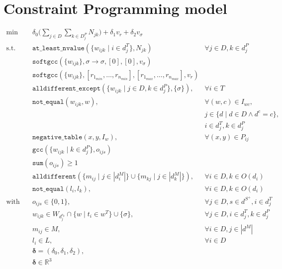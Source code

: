 \documentclass[../../thesis.tex]{subfiles}
\begin{document}
\chapter{Constraint Programming model}
 
\begin{align*}
  \text{min} \quad &\delta_0 \big( \sum_{j \in D} \sum_{k \in D^P_j} N_{jk} \big) + \delta_1 v_r + \delta_2 v_{\sigma} \\
  \text{s.t.} \quad &\texttt{at\_least\_nvalue}(\{ w_{ijk} \mid i \in d^T_j \}, N_{jk}) &\forall j \in D, k \in d^P_j \\
  &\texttt{softgcc}(\{ w_{ijk} \}, \sigma \rightarrow \sigma, [0], [0], v_{\sigma})  \\ 
  &\texttt{softgcc}(\{ w_{ijk} \}, [r_{1_{min}}, \dots, r_{n_{min}}], [r_{1_{max}}, \dots, r_{n_{max}}], v_{r}) \\
  &\texttt{alldifferent\_except}(\{w_{ijk} \mid j \in D, k \in d_j^P \}, \{ \sigma \}), &\forall i \in T \\ 
  &\texttt{not\_equal}(w_{ijk}, w), & \forall (w, c) \in I_{wc}, \\ 
  && j \in \{ d \mid d \in D \land d^c = c \}, \\
  && i \in d^T_j, k \in d_j^P \\
  &\texttt{negative\_table}(x, y, I_{w}),  &\forall (x, y) \in P_{ij} \\ 
  &\texttt{gcc}(\{ w_{ijk} \mid k \in d^P_j \}, o_{ijs}) \\ 
  &\texttt{sum}(o_{ijs}) \geq 1 \\
  &\texttt{alldifferent}(\{ m_{ij} \mid j \in |d_i^M| \} \cup \{ m_{kj} \mid j \in |d_k^M| \}), &\forall i \in D, k \in O(d_i) \\
  &\texttt{not_equal}(l_{i}, l_{k}), &\forall i \in D, k \in O(d_i) \\
  \text{with} \quad & o_{ijs} \in \{ 0, 1 \}, & \forall j \in D, s \in d^{S^{+}}, i \in d^T_j \\ 
  &w_{ijk} \in W_{d^{s_k}_j} \cap \{ w \mid t_i \in w^T \} \cup \{ \sigma \},& \forall j \in D, i \in d^T_j, k \in d^P_j \\ 
  &m_{ij} \in M, & \forall i \in D, j \in |d^M| \\ 
  &l_{i} \in L, & \forall i \in D \\
  &\bm{\delta} = (\delta_0, \delta_1, \delta_2), \\
  &\bm{\delta} \in \mathbb{R}^3
\end{align*}
\end{document}
